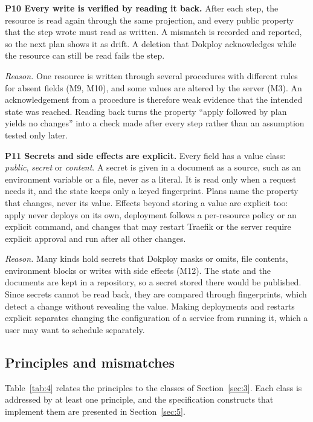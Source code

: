 \textbf{P10 Every write is verified by reading it back.} After each step, the resource is read again through
the same projection, and every public property that the step wrote must read as written. A mismatch is
recorded and reported, so the next plan shows it as drift. A deletion that Dokploy acknowledges while
the resource can still be read fails the step.

\emph{Reason.} One resource is written through several procedures with different rules for absent fields
(M9, M10), and some values are altered by the server (M3). An acknowledgement from a procedure is
therefore weak evidence that the intended state was reached. Reading back turns the property ``apply
followed by plan yields no changes'' into a check made after every step rather than an assumption
tested only later.

\textbf{P11 Secrets and side effects are explicit.} Every field has a value class: \emph{public}, \emph{secret} or
\emph{content}. A secret is given in a document as a source, such as an environment variable or a file, never
as a literal. It is read only when a request needs it, and the state keeps only a keyed fingerprint.
Plans name the property that changes, never its value. Effects beyond storing a value are explicit
too: apply never deploys on its own, deployment follows a per-resource policy or an explicit command,
and changes that may restart Traefik or the server require explicit approval and run after all
other changes.

\emph{Reason.} Many kinds hold secrets that Dokploy masks or omits, file contents, environment blocks or
writes with side effects (M12). The state and the documents are kept in a repository, so a secret
stored there would be published. Since secrets cannot be read back, they are compared through
fingerprints, which detect a change without revealing the value. Making deployments and restarts
explicit separates changing the configuration of a service from running it, which a user may want to
schedule separately.

\subsection{Principles and mismatches}\label{sec:4.4}

Table~\ref{tab:4} relates the principles to the classes of Section~\ref{sec:3}. Each class is addressed by at least one
principle, and the specification constructs that implement them are presented in Section~\ref{sec:5}.

